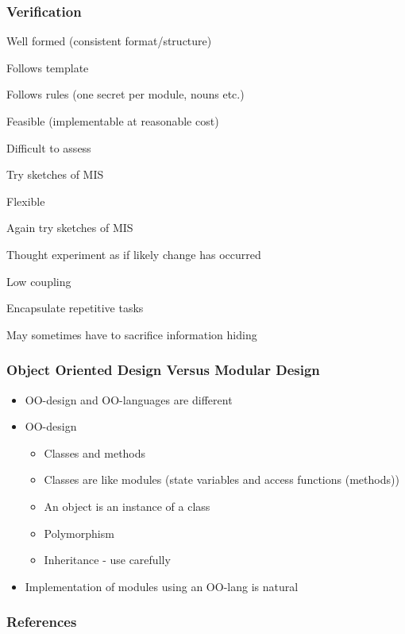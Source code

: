 \documentclass[t,12pt,numbers,fleqn]{beamer}
\begin{document}

\begin{frame}
\frametitle{Verification}

\bi
\item Well formed (consistent format/structure)
\bi
\item Follows template
\item Follows rules (one secret per module, nouns etc.)
\ei
\item Feasible (implementable at reasonable cost)
\bi
\item Difficult to assess
\item Try sketches of MIS
\ei
\item Flexible
\bi
\item Again try sketches of MIS
\item Thought experiment as if likely change has occurred
\item Low coupling
\item Encapsulate repetitive tasks
\ei
\item May sometimes have to sacrifice information hiding
\ei

\end{frame}


\begin{frame}
\frametitle{Object Oriented Design Versus Modular Design}
\begin{itemize}
\item OO-design and OO-languages are different
\item OO-design
\begin{itemize}
\item Classes and methods
\item Classes are like modules (state variables and access functions (methods))
\item An object is an instance of a class
\item Polymorphism
\item Inheritance - use carefully
\end{itemize}
\item Implementation of modules using an OO-lang is natural
\end{itemize}
\end{frame}


\begin{frame}[allowframebreaks]
\frametitle{References}



\end{frame}

\end{document}
